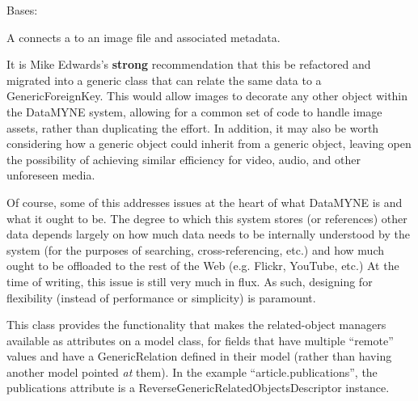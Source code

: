 \documentclass[letterpaper,10pt,english]{sphinxmanual}
\begin{document}
\begin{fulllineitems}
\label{generated/apps.profiles.models:apps.profiles.models.CourseImage}
Bases: {\hyperref[generated/apps.profiles.models:apps.profiles.models.BaseModel]{}}

A  connects a  to an image file and associated metadata.

It is Mike Edwards's \textbf{strong} recommendation that this be refactored and
migrated into a generic  class that can relate the same data to a
GenericForeignKey.  This would allow images to decorate any other object within
the DataMYNE system, allowing for a common set of code to handle image assets,
rather than duplicating the effort.  In addition, it may also be worth considering
how a generic  object could inherit from a generic  object, 
leaving open the possibility of achieving similar efficiency for video, audio, 
and other unforeseen media.

Of course, some of this addresses issues at the heart of what DataMYNE is and
what it ought to be.  The degree to which this system stores (or references)
other data depends largely on how much data needs to be internally understood
by the system (for the purposes of searching, cross-referencing, etc.) and how
much ought to be offloaded to the rest of the Web (e.g. Flickr, YouTube, etc.)
At the time of writing, this issue is still very much in flux.  As such,
designing for flexibility (instead of performance or simplicity) is paramount.


\begin{fulllineitems}
\label{generated/apps.profiles.models:apps.profiles.models.CourseImage.unit_permissions}
This class provides the functionality that makes the related-object
managers available as attributes on a model class, for fields that have
multiple ``remote'' values and have a GenericRelation defined in their model
(rather than having another model pointed \emph{at} them). In the example
``article.publications'', the publications attribute is a
ReverseGenericRelatedObjectsDescriptor instance.

\end{fulllineitems}


\end{fulllineitems}
\end{document}
